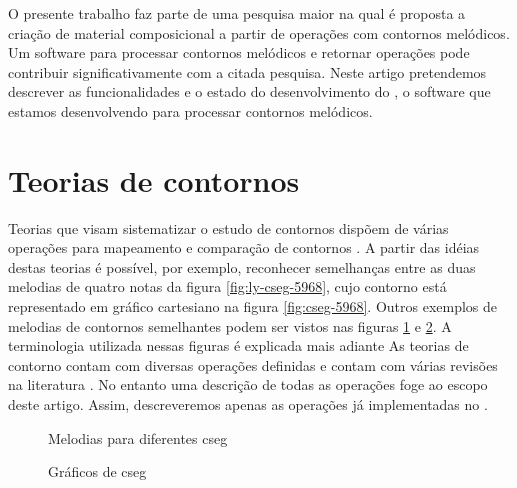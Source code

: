 O presente trabalho faz parte de uma pesquisa maior na qual é proposta
a criação de material composicional a partir de operações com
contornos melódicos. Um software para processar contornos melódicos e
retornar operações pode contribuir significativamente com a citada
pesquisa. Neste artigo pretendemos descrever as funcionalidades e o
estado do desenvolvimento do \goiaba, o software que estamos
desenvolvendo para processar contornos melódicos.

\section{Teorias de contornos}
\label{sec:teorias-de-contornos}

Teorias que visam sistematizar o estudo de contornos dispõem de várias
operações para mapeamento e comparação de contornos
\cite{friedmann85:methodology,friedmann87:response,morris87:composition,morris93:directions,marvin.ea87:relating,clifford95:contour,polansky.ea92:possible,quinn97:fuzzy,beard03:contour}. A
partir das idéias destas teorias é possível, por exemplo, reconhecer
semelhanças entre as duas melodias de quatro notas da figura
\ref{fig:ly-cseg-5968}, cujo contorno está representado em gráfico
cartesiano na figura \ref{fig:cseg-5968}. Outros exemplos de melodias
de contornos semelhantes podem ser vistos nas figuras
\ref{fig:melodias-cseg} e \ref{fig:graficos-cseg}. A terminologia
utilizada nessas figuras é explicada mais adiante As teorias de
contorno contam com diversas operações definidas e contam com várias
revisões na literatura \cite{clifford95:contour,beard03:contour}. No
entanto uma descrição de todas as operações foge ao escopo deste
artigo. Assim, descreveremos apenas as operações já implementadas no
\goiaba.

\begin{figure}
  \centering
  \caption{Melodias para diferentes cseg}
  \label{fig:melodias-cseg}
\end{figure}

\begin{figure}
  \centering
  \caption{Gráficos de cseg}
  \label{fig:graficos-cseg}
\end{figure}


